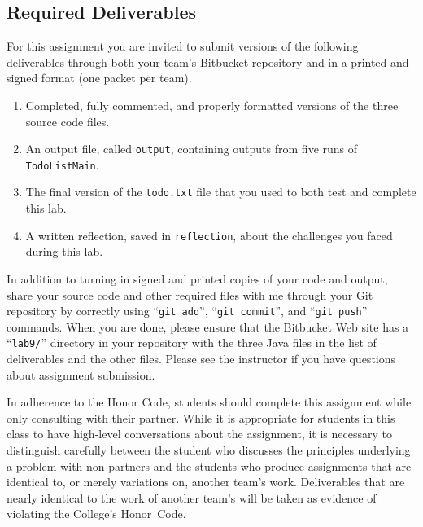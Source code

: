 
\vspace{-0.3in}
\subsection*{Required Deliverables}
\vspace{-0.05in}

For this assignment you are invited to submit versions of the following deliverables through both your team's Bitbucket
repository and in a printed and signed format (one packet per team).

\vspace{-0.1in}
\begin{enumerate}
    \setlength{\itemsep}{0pt}

  \item Completed, fully commented, and properly formatted versions of the three source code files.
  \item An output file, called {\tt output}, containing outputs from five runs of {\tt TodoListMain}.
  \item The final version of the {\tt todo.txt} file that you used to both test and complete this lab.
  \item A written reflection, saved in {\tt reflection}, about the challenges you faced during this lab.

\end{enumerate}
\vspace{-0.1in}

In addition to turning in signed and printed copies of your code and output, share your source code and other required
files with me through your Git repository by correctly using ``{\tt git add}'', ``{\tt git commit}'', and ``{\tt git
  push}'' commands. When you are done, please ensure that the Bitbucket Web site has a ``{\tt lab9/}'' directory in your
repository with the three Java files in the list of deliverables and the other files. Please see the instructor if
you have questions about assignment submission.

In adherence to the Honor Code, students should complete this assignment while only consulting with their partner. While
it is appropriate for students in this class to have high-level conversations about the assignment, it is necessary to
distinguish carefully between the student who discusses the principles underlying a problem with non-partners and the
students who produce assignments that are identical to, or merely variations on, another team's work.  Deliverables that
are nearly identical to the work of another team's will be taken as evidence of violating the College's \mbox{Honor
Code}.


